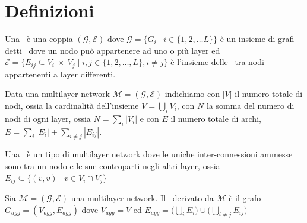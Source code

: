 \chapter{Definizioni}

\begin{definizione} 
    \label{def:muln}
    Una \muln\ è una coppia $(\mathcal{G}, \mathcal{E} )$ dove
    $\mathcal{G} = \{G_i \mid i \in \{1, 2, \dots L\}\}$ è un insieme di grafi
    detti \layer\ dove un nodo può appartenere ad uno o più layer ed 
    $\mathcal{E} = \{E_{ij} \subseteq V_i~\times~V_j \mid i,j \in \{1, 2, \dots, L\}, i \neq j\}$
    è l'insieme delle \interc\ tra nodi appartenenti a layer differenti.
\end{definizione}
%     

% 

\begin{definizione}
    Data una multilayer network $\mathcal{M}=(\mathcal{G}, \mathcal{E})$ 
    indichiamo con $|V|$ il numero totale di nodi, ossia la cardinalità dell'insieme $V = \bigcup\limits_{i} V_i$,
    con $N$ la somma del numero di nodi di ogni layer, ossia $N = \sum_{i}{|V_i|}$
    e con $E$ il numero totale di archi, $E = \sum_{i} |E_i| + \sum_{i \neq j} |E_{ij}|$.    
\end{definizione}

\begin{definizione} 
    \label{def:mulx}
    Una \mulx\ è un tipo di multilayer network dove le uniche inter-connessioni ammesse sono tra un 
    nodo e le sue controparti negli altri layer, ossia 
    $E_{ij} \subseteq \{ (v,v) \mid v \in {V_i \cap V_j} \} $
\end{definizione}



\begin{definizione} 
    \label{def:gragg}
    Sia $\mathcal{M} = (\mathcal{G}, \mathcal{E} )$ una multilayer network. 
    Il \gragg\ derivato da $\mathcal{M}$ è il grafo 
    $G_{\mathit{agg}} = (V_{\mathit{agg}}, E_{\mathit{agg}})$  dove $V_{\mathit{agg}} = V$ ed 
    $E_{\mathit{agg}} = \biggl( \bigcup\limits_{i} E_{i} \biggr) \cup 
                    \biggl( \bigcup\limits_{i \neq j} E_{ij} \biggr)$
\end{definizione}

